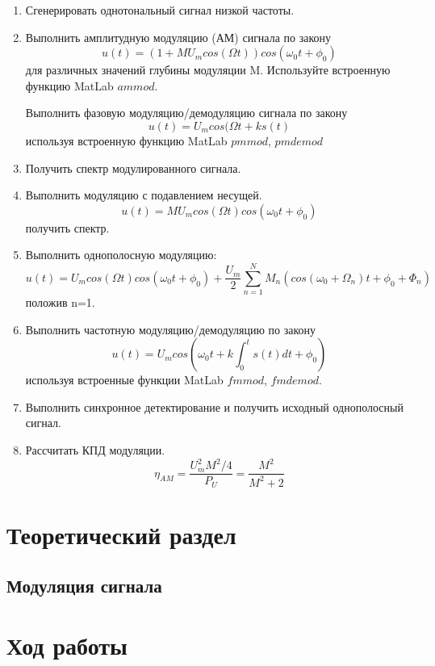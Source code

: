 \documentclass[a4paper,14pt]{extarticle}
\begin{document}
\begin{enumerate}
\item Сгенерировать однотональный сигнал низкой частоты.

\item Выполнить амплитудную модуляцию (АМ) сигнала по закону
$$ u(t) = (1 + MU_m cos(\Omega t)) cos(\omega_0 t + \phi_0)$$
для различных значений глубины модуляции M. Используйте встроенную функцию MatLab $ammod$.

Выполнить фазовую модуляцию/демодуляцию сигнала по закону 
$$ u(t) = U_m cos(\Omega t + ks(t)$$
используя встроенную функцию MatLab $pmmod$, $pmdemod$

\item Получить спектр модулированного сигнала.

\item Выполнить модуляцию с подавлением несущей.
$$ u(t) = MU_m cos(\Omega t) cos(\omega_0 t + \phi_0)$$
получить спектр.
\item Выполнить однополосную модуляцию:
$$\displaystyle u(t) = U_m cos(\Omega t) cos(\omega_0 t + \phi_0) + \frac{U_m}{2} \sum^N_{n=1}M_n(cos(\omega_0 + \Omega_n) t + \phi_0 + \Phi_n)$$
положив n=1.

\item Выполнить частотную модуляцию/демодуляцию по закону
$$\displaystyle u(t) = U_m cos(\omega_0 t + k \int_0^t s(t)dt + \phi_0)$$
используя встроенные функции MatLab $fmmod$, $fmdemod$.

\item Выполнить синхронное детектирование и получить исходный
однополосный сигнал.

\item Рассчитать КПД модуляции.
$$\displaystyle \eta_{AM} = \frac{U^2_m M^2/4}{P_U} = \frac{M^2}{M^2 + 2}$$
\end{enumerate}

\section{Теоретический раздел}

\subsection{Модуляция сигнала}



\section{Ход работы}
\end{document}

